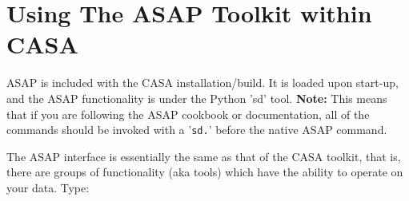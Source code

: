 

\section{Using The ASAP Toolkit within CASA}
\label{section:sd.asap}

ASAP is included with the CASA installation/build. It is loaded
upon start-up, and the ASAP functionality is under the
Python 'sd' tool.  {\bf Note:} This means that if you are following
the ASAP cookbook or documentation, all of the commands should be 
invoked with a '{\tt sd.}' before the native ASAP command.

The ASAP interface is essentially the same as that
of the CASA toolkit, that is, there are groups of functionality (aka
tools) which have the ability to operate on your data. Type:


